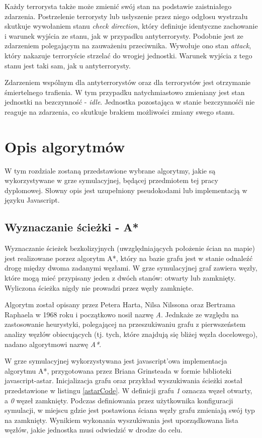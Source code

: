 Każdy terrorysta także może zmienić swój stan na podstawie zaistniałego zdarzenia. Postrzelenie terrorysty lub usłyszenie przez niego odgłosu wystrzału skutkuje wywołaniem stanu \emph{check direction}, który definiuje identyczne zachowanie i warunek wyjścia ze stanu, jak w przypadku antyterrorysty. Podobnie jest ze zdarzeniem polegającym na zauważeniu przeciwnika. Wywołuje ono stan \emph{attack}, który nakazuje terroryście strzelać do wrogiej jednostki. Warunek wyjścia z tego stanu jest taki sam, jak u antyterrorysty.

Zdarzeniem wspólnym dla antyterrorystów oraz dla terrorystów jest otrzymanie śmiertelnego trafienia. W tym przypadku natychmiastowo zmieniany jest stan jednostki na bezczynność - \emph{idle}. Jednostka pozostająca w stanie bezczynnośći nie reaguje na zdarzenia, co skutkuje brakiem możliwości zmiany swego stanu.

\section{Opis algorytmów}
W tym rozdziale zostaną przedstawione wybrane algorytmy, jakie są wykorzystywane w grze symulacyjnej, będącej przedmiotem tej pracy dyplomowej. Słowny opis jest uzupełniony pseudokodami lub implementacją w języku Javascript.

\subsection{Wyznaczanie ścieżki - A*}
Wyznaczanie ścieżek bezkolizyjnych (uwzględniających położenie ścian na mapie) jest realizowane porzez algorytm A*, który na bazie grafu jest w stanie odnaleźć drogę między dwoma zadanymi węzłami. W grze symulacyjnej graf zawiera węzły, które mogą mieć przypisany jeden z dwóch stanów: otwarty lub zamknięty. Wyliczona ścieżka nigdy nie prowadzi przez węzły zamknięte.

Algorytm został opisany przez Petera Harta, Nilsa Nilssona oraz Bertrama Raphaela w 1968 roku i początkowo nosił nazwę \emph{A}. Jednkaże ze względu na zastosowanie heurystyki, polegającej na przeszukiwaniu grafu z pierwszeństem analizy węzłów obiecujących (tj. tych, które znajdują się bliżej węzła docelowego), nadano algorytmowi nazwę \emph{A*}.

W grze symulacyjnej wykorzystywana jest javascript'owa implementacja algorytmu A*, przygotowana przez Briana Grinsteada w formie biblioteki javascript-astar\cite{astarPage}. Inicjalizacja grafu oraz przykład wyszukiwania ścieżki został przedstawione w listingu \ref{astarCode}. W definicji grafu \emph{1} oznacza węzeł otwarty, a \emph{0} węzeł zamknięty. Podczas definiowania przez użytkownika konfiguracji symulacji, w miejscu gdzie jest postawiona ściana węzły grafu zmieniają swój typ na zamknięty. Wynikiem wykonania wyszukiwania jest uporządkowana lista węzłów, jakie jednostka musi odwiedzić w drodze do celu.

